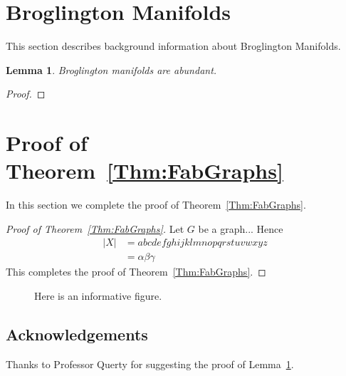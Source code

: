 \documentclass[12pt]{article}
\theoremstyle{plain}
\newtheorem{lemma}[theorem]{Lemma}
\theoremstyle{definition}
\theoremstyle{remark}
\begin{document}
\section{Broglington Manifolds}

This section describes background information about Broglington
Manifolds.

\begin{lemma}
  \label{lem:Technical}
  Broglington manifolds are abundant.
\end{lemma}

\begin{proof}

\end{proof}

\section{Proof of Theorem~\ref{Thm:FabGraphs}}

In this section we complete the proof of Theorem~\ref{Thm:FabGraphs}.

\begin{proof}[Proof of Theorem~\ref{Thm:FabGraphs}]
Let $G$ be a graph... Hence
  \begin{align}
    |X| &= abcdefghijklmnopqrstuvwxyz \nonumber\\
    &= \alpha\beta\gamma
  \end{align}
  This completes the proof of Theorem~\ref{Thm:FabGraphs}.
\end{proof}

\begin{figure}[!h]
  \begin{center}
  \end{center}
  \caption{\label{fig:InformativeFigure} Here is an informative
    figure.}
\end{figure}

\subsection*{Acknowledgements}
Thanks to Professor Querty for suggesting the proof of
Lemma~\ref{lem:Technical}.

%  
%  
\end{document}

